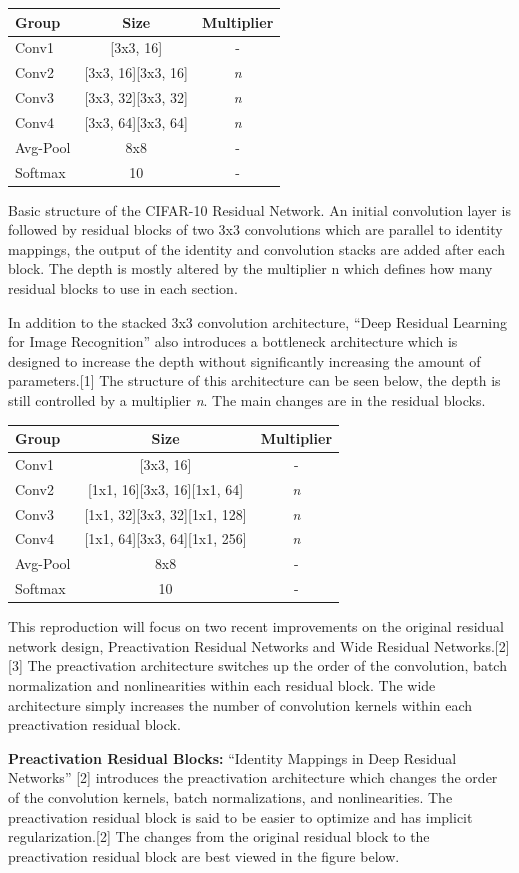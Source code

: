 \documentclass[10pt,a4paper,onecolumn]{article}
\begin{document}
\begin{longtable}[c]{@{}lcc@{}}
\toprule
Group & Size & Multiplier\tabularnewline
\midrule
\endhead
Conv1 & {[}3x3, 16{]} & -\tabularnewline
Conv2 & {[}3x3, 16{]}{[}3x3, 16{]} & \emph{n}\tabularnewline
Conv3 & {[}3x3, 32{]}{[}3x3, 32{]} & \emph{n}\tabularnewline
Conv4 & {[}3x3, 64{]}{[}3x3, 64{]} & \emph{n}\tabularnewline
Avg-Pool & 8x8 & -\tabularnewline
Softmax & 10 & -\tabularnewline
\bottomrule
\end{longtable}

Basic structure of the CIFAR-10 Residual Network. An initial convolution
layer is followed by residual blocks of two 3x3 convolutions which are
parallel to identity mappings, the output of the identity and
convolution stacks are added after each block. The depth is mostly
altered by the multiplier n which defines how many residual blocks to
use in each section.

In addition to the stacked 3x3 convolution architecture, ``Deep Residual
Learning for Image Recognition'' also introduces a bottleneck
architecture which is designed to increase the depth without
significantly increasing the amount of parameters.{[}1{]} The structure
of this architecture can be seen below, the depth is still controlled by
a multiplier \emph{n}. The main changes are in the residual blocks.

\begin{longtable}[c]{@{}lcc@{}}
\toprule
Group & Size & Multiplier\tabularnewline
\midrule
\endhead
Conv1 & {[}3x3, 16{]} & -\tabularnewline
Conv2 & {[}1x1, 16{]}{[}3x3, 16{]}{[}1x1, 64{]} &
\emph{n}\tabularnewline
Conv3 & {[}1x1, 32{]}{[}3x3, 32{]}{[}1x1, 128{]} &
\emph{n}\tabularnewline
Conv4 & {[}1x1, 64{]}{[}3x3, 64{]}{[}1x1, 256{]} &
\emph{n}\tabularnewline
Avg-Pool & 8x8 & -\tabularnewline
Softmax & 10 & -\tabularnewline
\bottomrule
\end{longtable}

This reproduction will focus on two recent improvements on the original
residual network design, Preactivation Residual Networks and Wide
Residual Networks.{[}2{]}{[}3{]} The preactivation architecture switches
up the order of the convolution, batch normalization and nonlinearities
within each residual block. The wide architecture simply increases the
number of convolution kernels within each preactivation residual block.

\textbf{Preactivation Residual Blocks:} ``Identity Mappings in Deep
Residual Networks'' {[}2{]} introduces the preactivation architecture
which changes the order of the convolution kernels, batch
normalizations, and nonlinearities. The preactivation residual block is
said to be easier to optimize and has implicit regularization.{[}2{]}
The changes from the original residual block to the preactivation
residual block are best viewed in the figure below.
\end{document}
